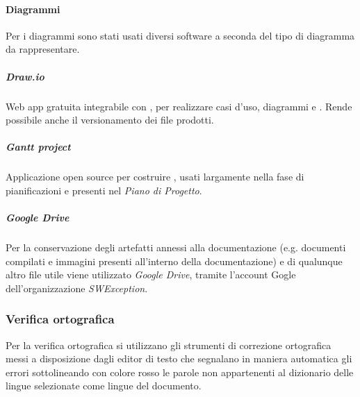 \paragraph{Diagrammi}
Per i diagrammi sono stati usati diversi software a seconda del tipo di diagramma da rappresentare.
\subparagraph{\textit{Draw.io}}
Web app gratuita integrabile con , per realizzare casi d'uso, diagrammi e . Rende possibile anche il versionamento dei file prodotti.
\subparagraph{\textit{Gantt project}}
Applicazione open source per costruire , usati largamente nella fase di pianificazioni e presenti nel \textit{Piano di Progetto}.
\subparagraph{\textit{Google Drive}}
Per la conservazione degli artefatti annessi alla documentazione (e.g. documenti compilati e immagini presenti all'interno della documentazione) e di qualunque altro file utile viene utilizzato \textit{Google Drive}, tramite l'account Gogle dell'organizzazione \textit{SWException}. 

\subsubsection{Verifica ortografica}
Per la verifica ortografica si utilizzano gli strumenti di correzione ortografica messi a disposizione dagli editor di testo che segnalano in maniera automatica gli errori sottolineando con colore rosso le parole non appartenenti al dizionario delle lingue selezionate come lingue del documento.
